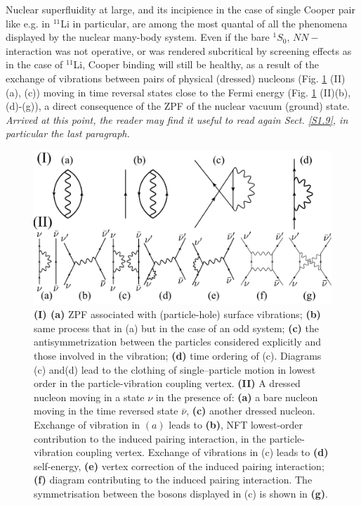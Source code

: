 \begin{subappendices}
Nuclear superfluidity at large, and its incipience in the case of single Cooper pair like e.g. in $^{11}$Li in particular, are among the most quantal of all  the phenomena displayed by the nuclear many-body 
system. Even if the bare $^1S_0$, $NN-$interaction was not operative, or was rendered subcritical by screening effects as in the case of $^{11}$Li, Cooper binding will still be healthy, as a result of the exchange of vibrations between pairs of physical (dressed) nucleons (Fig. \ref{fig6G1} (II) (a), (c)) moving in time reversal states close to the Fermi energy (Fig. \ref{fig6G1} (II)(b),(d)-(g)), a direct
consequence of the ZPF of the  nuclear vacuum (ground) state. \textit{Arrived at this point, the reader may find it useful to read again Sect. \ref{S1.9}, in particular the last paragraph.}
\begin{figure}
\centerline{\includegraphics[width=\textwidth]{C8/figsC8/fig6G1.pdf}}
\caption{{\bf (I) (a)} ZPF associated with (particle-hole) surface vibrations; 
{\bf (b)} same process that in (a) but in the case of an odd system; {\bf (c)} the antisymmetrization between the particles  considered explicitly and 
those involved in the vibration; {\bf (d)} time ordering of (c). 
Diagrams (c) and(d) lead to the clothing of single--particle motion  in lowest order in the 
particle-vibration coupling vertex.
{\bf (II)} A dressed  nucleon moving in a state $\nu$ in the presence of: {\bf (a)} a bare nucleon
moving in the time reversed state $\bar \nu$,
{\bf (c)} another dressed nucleon. Exchange of vibration in $(a)$ leads to {\bf (b)},  NFT 
lowest-order contribution to the induced pairing interaction, in the particle-vibration coupling vertex. Exchange 
of vibrations in {(c)}  leads to  {\bf (d)} self-energy, {\bf (e)} vertex correction of the  
induced pairing interaction;  {\bf (f)}  diagram contributing to the induced pairing interaction.
The symmetrisation between the bosons displayed in (c) is shown in {\bf (g)}.}\label{fig6G1}
\end{figure}


\end{subappendices}
